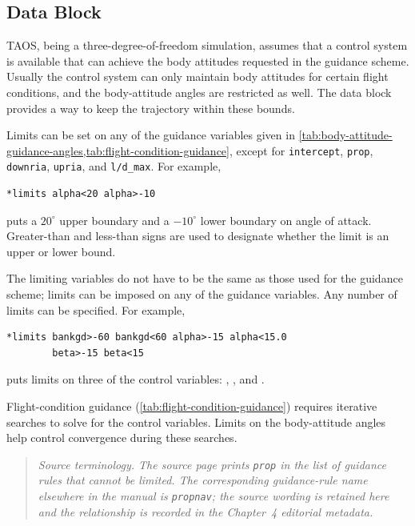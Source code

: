 \subsection{ Data Block}\label{sec:block-limits}

TAOS, being a three-degree-of-freedom simulation, assumes that a control system is
available that can achieve the body attitudes requested in the guidance scheme.
Usually the control system can only maintain body attitudes for certain flight
conditions, and the body-attitude angles are restricted as well. The
 data block provides a way to keep the trajectory within
these bounds.

Limits can be set on any of the guidance variables given in
\cref{tab:body-attitude-guidance-angles,tab:flight-condition-guidance}, except for
\texttt{intercept}, \texttt{prop}, \texttt{downria}, \texttt{upria}, and
\texttt{l/d\_max}. For example,

\begin{lstlisting}[style=taosmanual]
*limits alpha<20 alpha>-10
\end{lstlisting}

puts a $20^{\circ}$ upper boundary and a $-10^{\circ}$ lower boundary on angle of
attack. Greater-than and less-than signs are used to designate whether the limit is an
upper or lower bound.

The limiting variables do not have to be the same as those used for the guidance
scheme; limits can be imposed on any of the guidance variables. Any number of
limits can be specified. For example,

\begin{lstlisting}[style=taosmanual]
*limits bankgd>-60 bankgd<60 alpha>-15 alpha<15.0
        beta>-15 beta<15
\end{lstlisting}

puts limits on three of the control variables: , , and
.

Flight-condition guidance (\cref{tab:flight-condition-guidance}) requires iterative
searches to solve for the control variables. Limits on the body-attitude angles help
control convergence during these searches.

\begin{quote}\small\itshape
Source terminology. The source page prints \texttt{prop} in the list of guidance rules that cannot be
limited. The corresponding guidance-rule name elsewhere in the manual is
\texttt{propnav}; the source wording is retained here and the relationship is recorded
in the Chapter~4 editorial metadata.
\end{quote}
